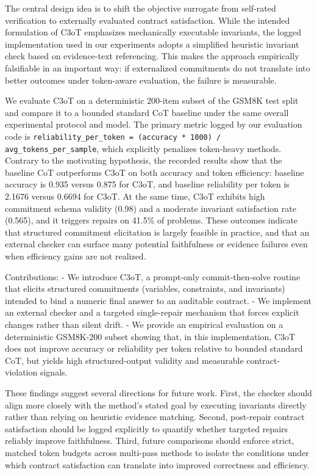 \documentclass[journal,article,submit,pdftex,moreauthors]{Definitions/mdpi}
\begin{document}
The central design idea is to shift the objective surrogate from self-rated verification to externally evaluated contract satisfaction. While the intended formulation of C3oT emphasizes mechanically executable invariants, the logged implementation used in our experiments adopts a simplified heuristic invariant check based on evidence-text referencing. This makes the approach empirically falsifiable in an important way: if externalized commitments do not translate into better outcomes under token-aware evaluation, the failure is measurable.

We evaluate C3oT on a deterministic 200-item subset of the GSM8K test split and compare it to a bounded standard CoT baseline under the same overall experimental protocol and model. The primary metric logged by our evaluation code is \texttt{reliability\_per\_token = (accuracy * 1000) / avg\_tokens\_per\_sample}, which explicitly penalizes token-heavy methods. Contrary to the motivating hypothesis, the recorded results show that the baseline CoT outperforms C3oT on both accuracy and token efficiency: baseline accuracy is 0.935 versus 0.875 for C3oT, and baseline reliability per token is 2.1676 versus 0.6694 for C3oT. At the same time, C3oT exhibits high commitment schema validity (0.98) and a moderate invariant satisfaction rate (0.565), and it triggers repairs on 41.5\% of problems. These outcomes indicate that structured commitment elicitation is largely feasible in practice, and that an external checker can surface many potential faithfulness or evidence failures even when efficiency gains are not realized.

Contributions:
- We introduce C3oT, a prompt-only commit-then-solve routine that elicits structured commitments (variables, constraints, and invariants) intended to bind a numeric final answer to an auditable contract.
- We implement an external checker and a targeted single-repair mechanism that forces explicit changes rather than silent drift.
- We provide an empirical evaluation on a deterministic GSM8K-200 subset showing that, in this implementation, C3oT does not improve accuracy or reliability per token relative to bounded standard CoT, but yields high structured-output validity and measurable contract-violation signals.

These findings suggest several directions for future work. First, the checker should align more closely with the method’s stated goal by executing invariants directly rather than relying on heuristic evidence matching. Second, post-repair contract satisfaction should be logged explicitly to quantify whether targeted repairs reliably improve faithfulness. Third, future comparisons should enforce strict, matched token budgets across multi-pass methods to isolate the conditions under which contract satisfaction can translate into improved correctness and efficiency.
\end{document}
